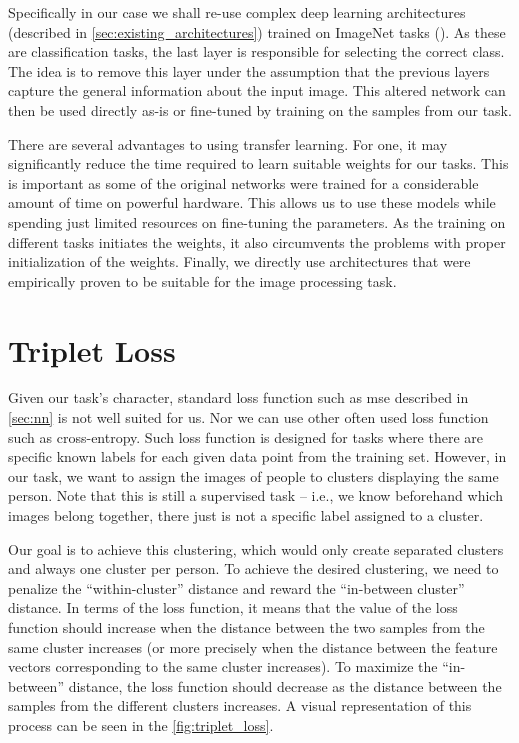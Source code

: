 Specifically in our case we shall re-use complex deep learning architectures (described in \autoref{sec:existing_architectures}) trained on ImageNet tasks (\cite{imagenetresults}). As these are classification tasks, the last layer is responsible for selecting the correct class. The idea is to remove this layer under the assumption that the previous layers capture the general information about the input image. This altered network can then be used directly as-is or fine-tuned by training on the samples from our task.

There are several advantages to using transfer learning. For one, it may significantly reduce the time required to learn suitable weights for our tasks. This is important as some of the original networks were trained for a considerable amount of time on powerful hardware. This allows us to use these models while spending just limited resources on fine-tuning the parameters. As the training on different tasks initiates the weights, it also circumvents the problems with proper initialization of the weights. Finally, we directly use architectures that were empirically proven to be suitable for the image processing task.

\section{Triplet Loss}

\label{sec:triplet_loss}

Given our task's character, standard loss function such as \gls{mse} described in \autoref{sec:nn} is not well suited for us. Nor we can use other often used loss function such as cross-entropy. Such loss function is designed for tasks where there are specific known labels for each given data point from the training set. However, in our task, we want to assign the images of people to clusters displaying the same person. Note that this is still a supervised task -- i.e., we know beforehand which images belong together, there just is not a specific label assigned to a cluster.

Our goal is to achieve this clustering, which would only create separated clusters and always one cluster per person. To achieve the desired clustering, we need to penalize the ``within-cluster'' distance and reward the ``in-between cluster'' distance. In terms of the loss function, it means that the value of the loss function should increase when the distance between the two samples from the same cluster increases (or more precisely when the distance between the feature vectors corresponding to the same cluster increases). To maximize the ``in-between'' distance, the loss function should decrease as the distance between the samples from the different clusters increases. A visual representation of this process can be seen in the \autoref{fig:triplet_loss}.

